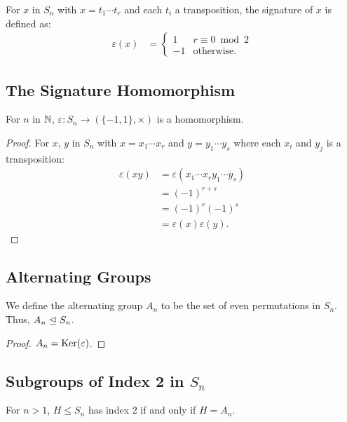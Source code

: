 For $x$ in $S_n$ with $x = t_1 \cdots t_r$ and each $t_i$ a transposition,
the signature of $x$ is defined as: \begin{align*}
    \varepsilon(x) &= \begin{cases}
        1 & r \equiv 0 \bmod 2 \\
        -1 & \text{otherwise}.
    \end{cases}
\end{align*}

\subsection{The Signature Homomorphism}

For $n$ in $\mathbb{N}$, $\varepsilon : S_n \to (\{-1, 1\}, \times)$ is a
homomorphism.

\begin{proof}
    For $x$, $y$ in $S_n$ with $x = x_1 \cdots x_r$ and $y = y_1 \cdots y_s$
    where each $x_i$ and $y_j$ is a transposition: \begin{align*}
        \varepsilon(xy) 
        &= \varepsilon(x_1 \cdots x_ry_1 \cdots y_s) \\
        &= (-1)^{r + s} \\
        &= (-1)^r(-1)^s \\
        &= \varepsilon(x)\varepsilon(y).
    \end{align*}
\end{proof}

\subsection{Alternating Groups}

We define the alternating group $A_n$ to be the set of even permutations
in $S_n$. Thus, $A_n \trianglelefteq S_n$.

\begin{proof}
    $A_n = \operatorname{Ker}(\varepsilon)$.
\end{proof}

\subsection{Subgroups of Index 2 in $S_n$} \label{4.8}

For $n > 1$, $H \leq S_n$ has index 2 if and only if $H = A_n$.

